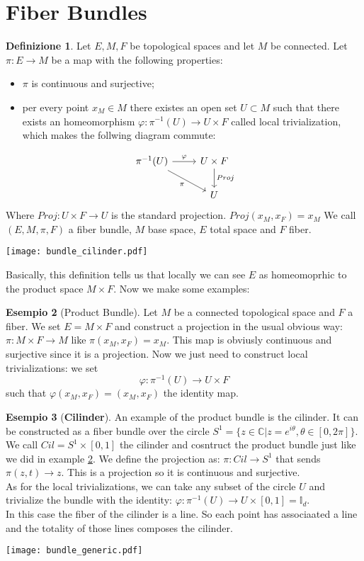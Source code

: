 \documentclass[12pt,a4paper]{report}
\theoremstyle{definition}
\newtheorem{Def}{Definizione}[chapter]
\theoremstyle{Theorem}
\theoremstyle{definition}
\newtheorem{Ex}[Def]{Esempio}
\theoremstyle{definition}
\theoremstyle{definition}
\begin{document}
	\section{Fiber Bundles}
	\begin{Def}
		Let $E,M,F$ be topological spaces and let $M$ be connected. Let $\pi:E\rightarrow M$ be a map with the following properties:
		\begin{itemize}
			\item $\pi$ is continuous and surjective;
			\item per every point $x_M\in M$ there existes an open set $U\subset M$ such that there exists an homeomorphism $\varphi:\pi^{-1}(U)\rightarrow U\times F$ called local trivialization, which makes the follwing diagram commute:
		\end{itemize}
		\[
		\begin{tikzcd}
			\pi^{-1}(U) \arrow{r}{\varphi} \arrow[swap]{dr}{\pi} & U\times F \arrow{d}{Proj}\\
			& U 
		\end{tikzcd}
		\]
		Where $Proj: U\times F\rightarrow U$ is the standard projection. $Proj(x_M,x_F)=x_M$
		We call $(E,M,\pi,F)$ a fiber bundle, $M$ base space, $E$ total space and $F$ fiber.
	\end{Def}
	\begin{center}
		\texttt{[image: bundle\_cilinder.pdf]}
	\end{center}
	Basically, this definition tells us that locally we can see $E$ as homeomoprhic to the product space $M\times F$. Now we make some examples:
	\begin{Ex}[Product Bundle]\label{Ex_1.1}
		Let $M$ be a connected topological space and $F$ a fiber. We set $E=M\times F$ and construct a projection in the usual obvious way:\\ $\pi:M\times F\rightarrow M$ like $\pi(x_M,x_F)=x_M$. This map is obviusly continuous and surjective since it is a projection. Now we just need to construct local trivializations: we set
		$$\varphi:\pi^{-1}(U)\rightarrow U\times F$$
		such that $\varphi(x_M,x_F)=(x_M,x_F)$ the identity map.
	\end{Ex}
	\begin{Ex}[\textbf{Cilinder}] \label{Ex_1.2}
		An example of the product bundle is the cilinder. It can be constructed as a fiber bundle over the circle $S^1=\{z\in \mathbb{C}|z=e^{i\theta}, \theta\in[0,2\pi]\}$. We call $Cil=S^1\times [0,1]$ the cilinder and cosntruct the product bundle just like we did in example \ref{Ex_1.1}. We define the projection as: $\pi:Cil\rightarrow S^1$ that sends $\pi(z,t)\rightarrow z$. This is a projection so it is continuous and surjective.\\
		As for the local trivializations, we can take any subset of the circle $U$ and trivialize the bundle with the identity:
		$\varphi:\pi^{-1}(U)\rightarrow U\times [0,1]=\mathbb{I}_d$.\\
		In this case the fiber of the cilinder is a line. So each point has associaated a line and the totality of those lines composes the cilinder.
		\begin{center}
			\texttt{[image: bundle\_generic.pdf]}
	\end{center}
	\end{Ex}
\end{document}
